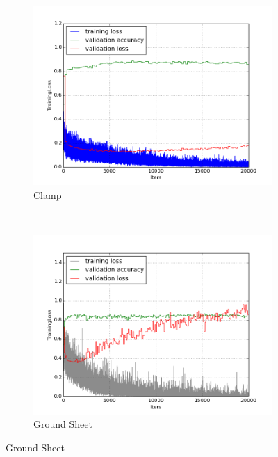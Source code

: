 \documentclass[a4paper,11pt]{article}
\begin{document}
\begin{figure}
        \centering
        \begin{subfigure}[b]{0.3\textwidth}
                \includegraphics[width=\textwidth]{images/plot_clampdet_conv4.png}
                \caption{Clamp}
                \label{fig:gull}
        \end{subfigure}%
        ~ %
        \begin{subfigure}[b]{0.3\textwidth}
                \includegraphics[width=\textwidth]{images/plot_caffe_ground_sheet_conv4.png}
                \caption{Ground Sheet}

\end{subfigure}
\end{figure}
\end{document}
